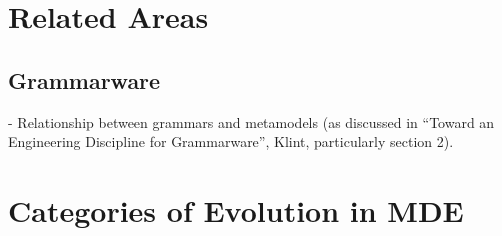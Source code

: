 

\section{Related Areas}

\subsection{Grammarware}
\label{subsec:grammarware}
- Relationship between grammars and metamodels (as discussed in ``Toward an Engineering Discipline for Grammarware'', Klint, particularly section 2).

\section{Categories of Evolution in MDE}
